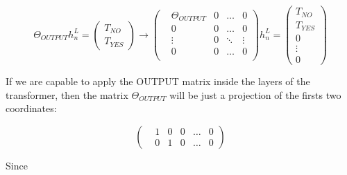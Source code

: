 \begin{equation*}
    \Theta_{OUTPUT}h_n^L =   
    \left(\begin{matrix}
        T_{NO} \\
        T_{YES}
    \end{matrix}\right) \longrightarrow
    \left(\begin{matrix}
        &\Theta_{OUTPUT} &0 &\dots  &0 \\
        &0                &0 &\dots  &0 \\
        &\vdots           &0 &\ddots &\vdots \\
        &0                &0 &\dots  &0 \\
    \end{matrix}\right)h_n^L = 
    \left(\begin{matrix}
        T_{NO} \\
        T_{YES} \\ 
        0 \\
        \vdots \\
        0
    \end{matrix}\right)
\end{equation*}


If we are capable to apply the OUTPUT matrix inside the layers of the transformer, then the matrix $\Theta_{OUTPUT}$ will be just a projection of the firsts two coordinates:


\begin{equation*}
    \left(\begin{matrix}
        &1 &0 &0 &\dots &0 \\
        &0 &1 &0 &\dots &0 
    \end{matrix}\right)
\end{equation*}

Since

